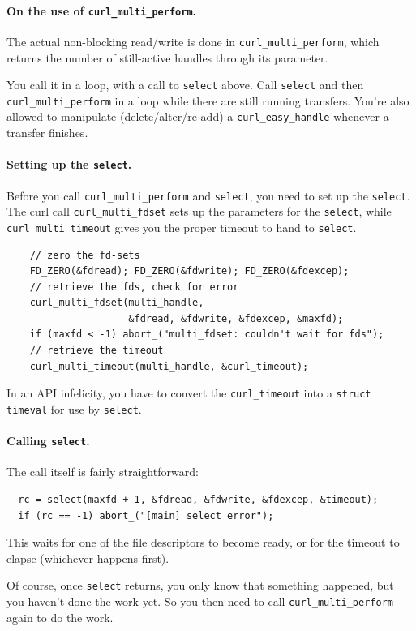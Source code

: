 \paragraph{On the use of {\tt curl\_multi\_perform}.} The actual non-blocking read/write
is done in {\tt curl\_multi\_perform}, which returns the number of still-active handles 
through its parameter.

You call it in a loop, with a call to {\tt select} above. Call {\tt select} and then
{\tt curl\_multi\_perform} in a loop while there are still running transfers.
You're also allowed to manipulate (delete/alter/re-add) a {\tt curl\_easy\_handle} whenever
a transfer finishes.

\paragraph{Setting up the {\tt select}.} Before you call {\tt curl\_multi\_perform}
and {\tt select}, you need to set up the {\tt select}. The curl call {\tt curl\_multi\_fdset}
sets up the parameters for the {\tt select}, while {\tt curl\_multi\_timeout} gives you
the proper timeout to hand to {\tt select}.

\begin{verbatim}
    // zero the fd-sets
    FD_ZERO(&fdread); FD_ZERO(&fdwrite); FD_ZERO(&fdexcep);
    // retrieve the fds, check for error
    curl_multi_fdset(multi_handle, 
                     &fdread, &fdwrite, &fdexcep, &maxfd);
    if (maxfd < -1) abort_("multi_fdset: couldn't wait for fds");
    // retrieve the timeout
    curl_multi_timeout(multi_handle, &curl_timeout);
\end{verbatim}

In an API infelicity, you have to convert the {\tt curl\_timeout} into a
{\tt struct timeval} for use by {\tt select}.

\paragraph{Calling {\tt select}.}
The call itself is fairly straightforward:
\begin{verbatim}
  rc = select(maxfd + 1, &fdread, &fdwrite, &fdexcep, &timeout);
  if (rc == -1) abort_("[main] select error");
\end{verbatim}
This waits for one of the file descriptors to become ready, or for the
timeout to elapse (whichever happens first).

Of course, once {\tt select} returns, you only know that something
happened, but you haven't done the work yet. So you then need to call
{\tt curl\_multi\_perform} again to do the work.

